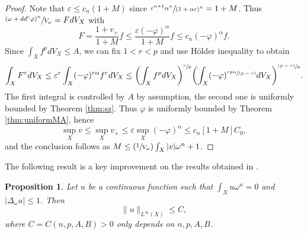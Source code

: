 \documentclass[10pt]{amsart}
\newcommand{\Psfrac}[2]{(\sfrac{#1}{#2})}
\newcommand{\psfrac}[2]{\sfrac{(#1)}{#2}}
\newcommand{\spfrac}[2]{\sfrac{#1}{(#2)}}
\newtheorem{prop}[theorem]{Proposition}
\theoremstyle{definition}
\let\e\varepsilon
\let\f\varphi
\begin{document}
\begin{proof}
Note that $\e \leq c_n (1+M)$ since $\sfrac{\e^{n+1}\alpha^n}{(1+\alpha \e)^n}=1+M$.
Thus $\sfrac{(\omega+dd^c \f)^n}{V_{\omega}}=F dV_X$
with
\[
F=\frac{1+v_+}{1+M} f \leq \frac{\e (-\f)^{\alpha}}{1+M} f \leq c_n (-\f)^{\alpha} f.
\]
Since $\int_X f^p dV_X \leq A$,
we can fix $1<r<p$ and use
Hölder inequality to obtain
\[
\int_X F^r dV_X \leq \e^r \int_X (-\f)^{r\alpha} f^r dV_X \leq
\biggl( \int_X f^p dV_X \biggr)^{\sfrac{r}{p}}
\biggl( \int_X (-\f)^{\spfrac{rp\alpha}{p-r}} dV_X \biggr)^{\psfrac{p-r}{p}}.
\]
The first integral is controlled by $A$ by assumption, the second one is uniformly bounded by Theorem \ref{thm:sz}.
Thus $\f$ is uniformly bounded by Theorem \ref{thm:uniformMA}, hence
\[
\sup_X v \leq \sup_X v_+ \leq \e \sup_X (-\f)^{\alpha} \leq c_n [1+M] C_0,
\]
and the conclusion follows as $M\leq \Psfrac{1}{V_\omega} \int_X |v| \omega^n+1$.
\end{proof}

The following result is a key improvement on the results obtained in \cite{GPSS22}.

\begin{prop} \label{prop:key}
Let $u$ be a continuous function such that $\int_X\! u \omega^n\!=\!0$
and~\hbox{$|\Delta_{\omega} u| \!\leq\! 1$}. Then
\[
\|u\|_{L^{\infty}(X)} \leq C,
\]
where $C=C(n,p,A,B)>0$ only depends on $n,p,A,B$.
\end{prop}
\end{document}
